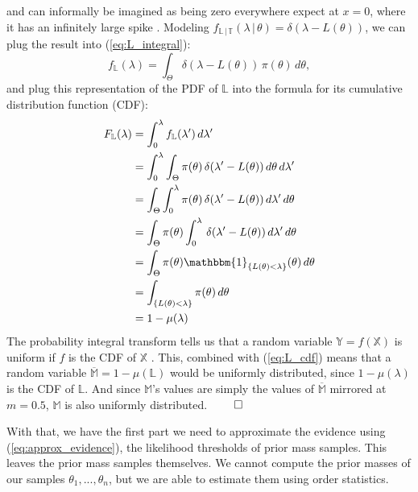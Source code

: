 \documentclass[12pt, a4paper]{report}
\begin{document}
and can informally be imagined as being zero everywhere expect at $x=0$, where it has an infinitely large spike \cite[600]{mckay}.
Modeling $f_{\mathbb{L} \,|\, \mathbb{T}}(\lambda \,|\, \theta) = \delta(\lambda - L(\theta))$, we can plug the result into (\ref{eq:L_integral}):
\begin{equation*}
    f_\mathbb{L}(\lambda) = \int_\Theta \delta(\lambda - L(\theta)) \, \pi(\theta) \, d\theta,
\end{equation*}
and plug this representation of the PDF of $\mathbb{L}$ into the formula for its cumulative distribution function (CDF):
\begin{align}
    F_\mathbb{L}(\lambda) &= \int_0^\lambda f_\mathbb{L}(\lambda') \, d\lambda' \nonumber\\
    &= \int_0^\lambda \int_\Theta \pi(\theta) \, \delta(\lambda' - L(\theta)) \, d\theta \, d\lambda' \nonumber\\
    &= \int_\Theta \int_0^\lambda \pi(\theta) \, \delta(\lambda' - L(\theta)) \, d\lambda'\, d\theta \\
    &= \int_\Theta \pi(\theta) \int_0^\lambda \, \delta(\lambda' - L(\theta)) \, d\lambda' \, d\theta \nonumber\\
    &= \int_\Theta \pi(\theta) \mathbbm{1}_{\{L(\theta) < \lambda\}}(\theta) \, d\theta \\
    &= \int_{\{L(\theta) < \lambda\}} \pi(\theta) \, d\theta \nonumber\\
    &= 1 - \mu(\lambda) \label{eq:L_cdf}
\end{align}
The probability integral transform tells us that a random variable $\mathbb{Y} = f(\mathbb{X})$ is uniform if $f$ is the CDF of $\mathbb{X}$ \cite[54]{casellaberger}.
This, combined with (\ref{eq:L_cdf}) means that a random variable $\overline{\mathbb{M}} = 1 - \mu(\mathbb{L})$ would be uniformly distributed, since $1 - \mu(\lambda)$ is the CDF of $\mathbb{L}$.
And since $\mathbb{M}$'s values are simply the values of $\overline{\mathbb{M}}$ mirrored at $m = 0.5$, $\mathbb{M}$ is also uniformly distributed.
\hfill $\qed$

With that, we have the first part we need to approximate the evidence using (\ref{eq:approx_evidence}), the likelihood thresholds of prior mass samples.
This leaves the prior mass samples themselves.
We cannot compute the prior masses of our samples $\theta_1, ... ,\theta_n$, but we are able to estimate them using order statistics.
\end{document}

